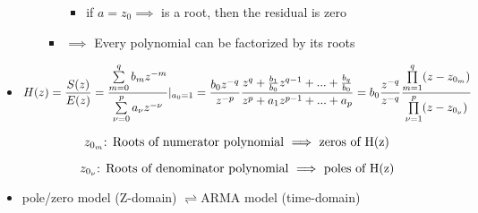 \begin{itemize}
\begin{itemize}
\begin{itemize}
\begin{itemize}
\item  if \begin{math} a = z_0 \implies\end{math} is a root, then the residual is zero

\end{itemize}
\item \begin{math}\implies\end{math}  Every polynomial can be factorized by its roots
\end{itemize}
\end{itemize}


\item \begin{equation*}\MakeUppercase{\filterFunc}(z)  = \frac{\MakeUppercase{\filtOutFunc}(z)}{\MakeUppercase{\excitationFunc}(z)} = \frac{\sum\limits^{\maFiltOrder}_{\maConvIndex = 0}\maFiltCoef_{\maConvIndex }z^{-\maConvIndex}}{\sum\limits^{\arFiltOrder}_{\arConvIndex = 0}\arFiltCoef_{\arConvIndex }z^{-\arConvIndex}}     |_{a_0 = 1} =\frac{\maFiltCoef_0z^{-\maFiltOrder}}{z^{-\arFiltOrder}}\frac{z^{\maFiltOrder}+\frac{\maFiltCoef_1}{\maFiltCoef_0}z^{\maFiltOrder-1}+...+\frac{\maFiltCoef_{\maFiltOrder}}{\maFiltCoef_0}}{z^{\arFiltOrder}+\arFiltCoef_1z^{\arFiltOrder-1}+...+\arFiltCoef_{\arFiltOrder}} = b_0\frac{z^{-\maFiltOrder}}{z^{-\maFiltOrder}}\frac{\prod\limits^{\maFiltOrder}_{\maConvIndex=1}(z - z_{0_{\maConvIndex}})}{\prod\limits^{\arFiltOrder}_{\arConvIndex = 1}(z - z_{0_{\arConvIndex}})}\end{equation*}

\begin{equation*}\mbox{\begin{math}z_{0_{\maConvIndex}}\end{math}: Roots of numerator polynomial  \begin{math}\implies\end{math} zeros of \MakeUppercase{\filterFunc}(z)}\end{equation*}

\begin{equation*}\mbox{\begin{math}z_{0_{\arConvIndex}}\end{math}: Roots of denominator polynomial  \begin{math}\implies\end{math} poles of \MakeUppercase{\filterFunc}(z)}\end{equation*}

\item{pole/zero model (Z-domain) \begin{math}\rightleftharpoons\end{math}ARMA model (time-domain) }


\end{itemize}
